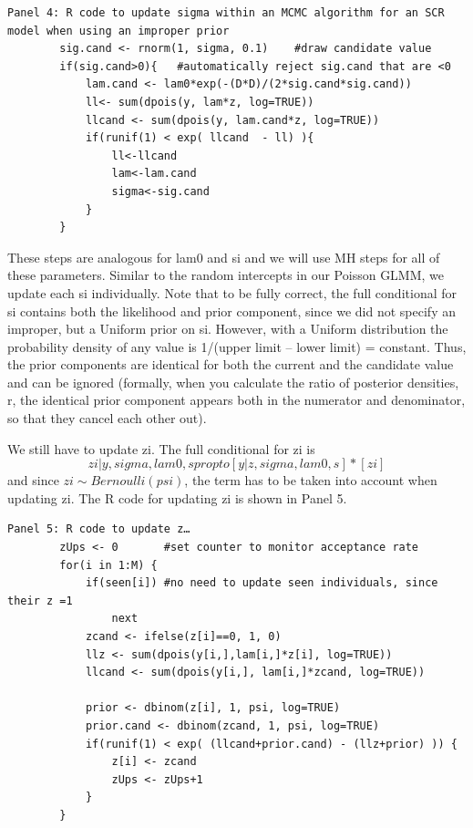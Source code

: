 \begin{verbatim}
Panel 4: R code to update sigma within an MCMC algorithm for an SCR model when using an improper prior
        sig.cand <- rnorm(1, sigma, 0.1)	#draw candidate value
        if(sig.cand>0){   #automatically reject sig.cand that are <0
            lam.cand <- lam0*exp(-(D*D)/(2*sig.cand*sig.cand))
            ll<- sum(dpois(y, lam*z, log=TRUE))
            llcand <- sum(dpois(y, lam.cand*z, log=TRUE))
            if(runif(1) < exp( llcand  - ll) ){
                ll<-llcand
                lam<-lam.cand
                sigma<-sig.cand
            }
        }

\end{verbatim}

These steps are analogous for lam0 and si and we will use MH steps for
all of these parameters. Similar to the random intercepts in our
Poisson GLMM, we update each si individually. Note that to be fully
correct, the full conditional for si contains both the likelihood and
prior component, since we did not specify an improper, but a Uniform
prior on si. However, with a Uniform distribution the probability
density of any value is 1/(upper limit – lower limit) =
constant. Thus, the prior components are identical for both the
current and the candidate value and can be ignored (formally, when you
calculate the ratio of posterior densities, r, the identical prior
component appears both in the numerator and denominator, so that they
cancel each other out). 

We still have to update zi. The full conditional for zi is
\[
zi|y, sigma, lam0, s propto [y|z,sigma, lam0, s] * [zi]
\]
and since $zi \sim Bernoulli(psi)$, 
the term has to be taken into account when updating zi. The R code for updating zi is shown in Panel 5.

\begin{verbatim}
Panel 5: R code to update z…
        zUps <- 0		#set counter to monitor acceptance rate
        for(i in 1:M) {
            if(seen[i])	#no need to update seen individuals, since their z =1
                next
            zcand <- ifelse(z[i]==0, 1, 0)
            llz <- sum(dpois(y[i,],lam[i,]*z[i], log=TRUE))
            llcand <- sum(dpois(y[i,], lam[i,]*zcand, log=TRUE))

            prior <- dbinom(z[i], 1, psi, log=TRUE)
            prior.cand <- dbinom(zcand, 1, psi, log=TRUE)
            if(runif(1) < exp( (llcand+prior.cand) - (llz+prior) )) {
                z[i] <- zcand
                zUps <- zUps+1
            }
        }
\end{verbatim}

